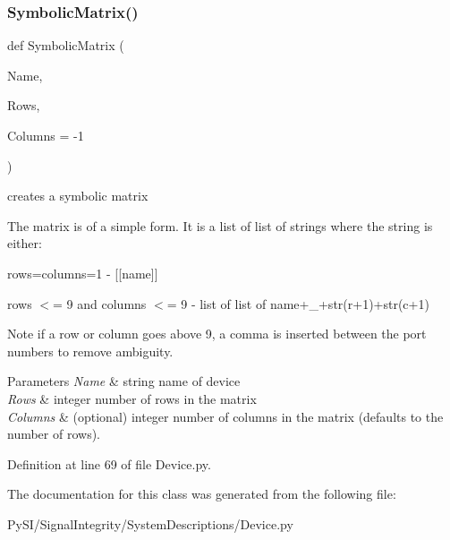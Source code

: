 \mbox{\label{classSignalIntegrity_1_1SystemDescriptions_1_1Device_1_1Device_a2c70eb13042897e97cc142e6a0f69300}} 
\subsubsection{\texorpdfstring{Symbolic\+Matrix()}{SymbolicMatrix()}}
{\footnotesize\ttfamily def Symbolic\+Matrix (\begin{DoxyParamCaption}\item[{}]{Name,  }\item[{}]{Rows,  }\item[{}]{Columns = {\ttfamily -\/1} }\end{DoxyParamCaption})\hspace{0.3cm}{\ttfamily [static]}}



creates a symbolic matrix 

The matrix is of a simple form. It is a list of list of strings where the string is either\+:
\begin{DoxyItemize}
\item rows=columns=1 -\/ \mbox{[}\mbox{[}name\mbox{]}\mbox{]}
\item rows $<$= 9 and columns $<$= 9 -\/ list of list of name+\textquotesingle{}\+\_\+\textquotesingle{}+str(r+1)+str(c+1) \begin{DoxyNote}{Note}
if a row or column goes above 9, a comma is inserted between the port numbers to remove ambiguity. 
\end{DoxyNote}

\begin{DoxyParams}{Parameters}
{\em Name} & string name of device \\
\hline
{\em Rows} & integer number of rows in the matrix \\
\hline
{\em Columns} & (optional) integer number of columns in the matrix (defaults to the number of rows). \\
\hline
\end{DoxyParams}

\end{DoxyItemize}

Definition at line 69 of file Device.\+py.



The documentation for this class was generated from the following file\+:\begin{DoxyCompactItemize}
\item 
Py\+S\+I/\+Signal\+Integrity/\+System\+Descriptions/Device.\+py\end{DoxyCompactItemize}
